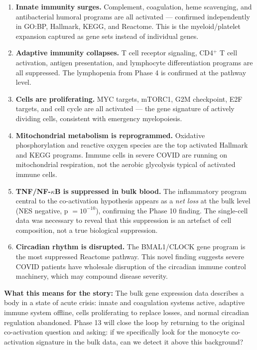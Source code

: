 \documentclass[11pt, a4paper]{article}
\begin{document}
\begin{enumerate}[nosep]
  \item \textbf{Innate immunity surges.}
        Complement, coagulation, heme scavenging, and antibacterial humoral
        programs are all activated — confirmed independently in GO:BP, Hallmark,
        KEGG, and Reactome. This is the myeloid/platelet expansion captured as
        gene sets instead of individual genes.

  \item \textbf{Adaptive immunity collapses.}
        T cell receptor signaling, CD4$^+$ T cell activation, antigen presentation,
        and lymphocyte differentiation programs are all suppressed.
        The lymphopenia from Phase 4 is confirmed at the pathway level.

  \item \textbf{Cells are proliferating.}
        MYC targets, mTORC1, G2M checkpoint, E2F targets, and cell cycle are
        all activated — the gene signature of actively dividing cells,
        consistent with emergency myelopoiesis.

  \item \textbf{Mitochondrial metabolism is reprogrammed.}
        Oxidative phosphorylation and reactive oxygen species are the
        top activated Hallmark and KEGG programs. Immune cells in severe
        COVID are running on mitochondrial respiration, not the aerobic
        glycolysis typical of activated immune cells.

  \item \textbf{TNF/NF-$\kappa$B is suppressed in bulk blood.}
        The inflammatory program central to the co-activation hypothesis
        appears as a \textit{net loss} at the bulk level (NES negative,
        p $= 10^{-10}$), confirming the Phase 10 finding. The single-cell
        data was necessary to reveal that this suppression is an artefact of
        cell composition, not a true biological suppression.

  \item \textbf{Circadian rhythm is disrupted.}
        The BMAL1/CLOCK gene program is the most suppressed Reactome pathway.
        This novel finding suggests severe COVID patients have wholesale
        disruption of the circadian immune control machinery, which may
        compound disease severity.
\end{enumerate}

\textbf{What this means for the story:}
The bulk gene expression data describes a body in a state of acute crisis:
innate and coagulation systems active, adaptive immune system offline,
cells proliferating to replace losses, and normal circadian regulation abandoned.
Phase 13 will close the loop by returning to the original co-activation question
and asking: if we specifically look for the monocyte co-activation signature
in the bulk data, can we detect it above this background?
\end{document}
